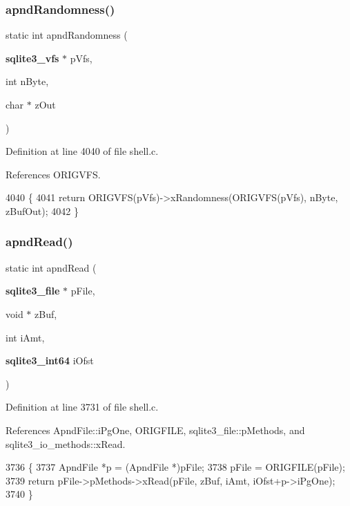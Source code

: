 \subsubsection{apnd\+Randomness()}
{\footnotesize\ttfamily static int apnd\+Randomness (\begin{DoxyParamCaption}\item[{\textbf{ sqlite3\+\_\+vfs} $\ast$}]{p\+Vfs,  }\item[{int}]{n\+Byte,  }\item[{char $\ast$}]{z\+Out }\end{DoxyParamCaption})\hspace{0.3cm}{\ttfamily [static]}}



Definition at line 4040 of file shell.\+c.



References O\+R\+I\+G\+V\+FS.


\begin{DoxyCode}
4040                                                                       \{
4041   \textcolor{keywordflow}{return} ORIGVFS(pVfs)->xRandomness(ORIGVFS(pVfs), nByte, zBufOut);
4042 \}
\end{DoxyCode}
\mbox{\label{shell_8c_a8841af35431e993f748d31af994d4124}} 
\subsubsection{apnd\+Read()}
{\footnotesize\ttfamily static int apnd\+Read (\begin{DoxyParamCaption}\item[{\textbf{ sqlite3\+\_\+file} $\ast$}]{p\+File,  }\item[{void $\ast$}]{z\+Buf,  }\item[{int}]{i\+Amt,  }\item[{\textbf{ sqlite3\+\_\+int64}}]{i\+Ofst }\end{DoxyParamCaption})\hspace{0.3cm}{\ttfamily [static]}}



Definition at line 3731 of file shell.\+c.



References Apnd\+File\+::i\+Pg\+One, O\+R\+I\+G\+F\+I\+LE, sqlite3\+\_\+file\+::p\+Methods, and sqlite3\+\_\+io\+\_\+methods\+::x\+Read.


\begin{DoxyCode}
3736  \{
3737   ApndFile *p = (ApndFile *)pFile;
3738   pFile = ORIGFILE(pFile);
3739   \textcolor{keywordflow}{return} pFile->pMethods->xRead(pFile, zBuf, iAmt, iOfst+p->iPgOne);
3740 \}
\end{DoxyCode}
\mbox{\label{shell_8c_a98981cc0d314a85d78f7a6524a811037}} 
